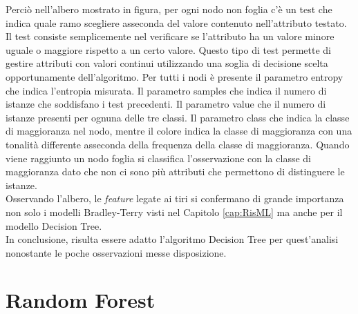 Perciò nell'albero mostrato in figura, per ogni nodo non foglia c'è un test che indica quale ramo scegliere asseconda del valore contenuto nell'attributo testato. Il test consiste semplicemente nel verificare se l'attributo ha un valore minore uguale o maggiore rispetto a un certo valore. Questo tipo di test permette di gestire attributi con valori continui utilizzando una soglia di decisione scelta opportunamente dell'algoritmo. Per tutti i nodi è presente il parametro \textsf{entropy} che indica l'entropia misurata. Il parametro \textsf{samples} che indica il numero di istanze che soddisfano i test precedenti. Il parametro \textsf{value} che il numero di istanze presenti per ognuna delle tre classi. Il parametro \textsf{class} che indica la classe di maggioranza nel nodo, mentre il colore indica la classe di maggioranza con una tonalità differente asseconda della frequenza della classe di maggioranza. Quando viene raggiunto un nodo foglia si classifica l'osservazione con la classe di maggioranza dato che non ci sono più attributi che permettono di distinguere le istanze.\\
Osservando l'albero, le \emph{feature} legate ai tiri si confermano di grande importanza non solo i modelli Bradley-Terry visti nel Capitolo \ref{cap:RisML} ma anche per il modello Decision Tree.\\
In conclusione, risulta essere adatto l'algoritmo Decision Tree per quest'analisi nonostante le poche osservazioni messe disposizione.

\section{Random Forest}